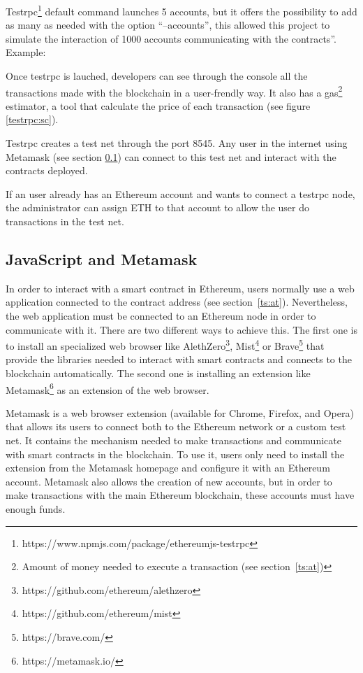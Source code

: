 \begin{itemize}
  Testrpc\footnote{https://www.npmjs.com/package/ethereumjs-testrpc} default
  command launches 5 accounts, but it offers the possibility to add as many as
  needed with the option ``--accounts'', this allowed this project to simulate
  the interaction of 1000 accounts communicating with the contracts''. Example:

   Once testrpc is lauched, developers can see through
  the console all the transactions made with the blockchain in a user-frendly
  way. It also has a gas\footnote{Amount of money needed to execute a
    transaction (see section~\ref{ts:at})} estimator, a tool that calculate the
  price of each transaction (see figure \ref{testrpc:sc}).

   Testrpc creates a test net through the port 8545. Any
  user in the internet using Metamask (see section \ref{jsmm}) can connect to
  this test net and interact with the contracts deployed.

   If an user already has an Ethereum
  account and wants to connect a testrpc node, the administrator can assign ETH
  to that account to allow the user do transactions in the test net.
\end{itemize}

\subsection{JavaScript and Metamask}
\label{jsmm}

In order to interact with a smart contract in Ethereum, users normally use a web
application connected to the contract address (see section~\ref{ts:at}).
Nevertheless, the web application must be connected to an Ethereum node in order
to communicate with it. There are two different ways to achieve this. The first
one is to install an specialized web browser like
AlethZero\footnote{https://github.com/ethereum/alethzero},
Mist\footnote{https://github.com/ethereum/mist} or
Brave\footnote{https://brave.com/} that provide the libraries needed to interact
with smart contracts and connects to the blockchain automatically. The second
one is installing an extension like Metamask\footnote{https://metamask.io/} as
an extension of the web browser.


Metamask is a web browser extension (available for Chrome, Firefox, and Opera)
that allows its users to connect both to the Ethereum network or a custom test
net. It contains the mechanism needed to make transactions and communicate with
smart contracts in the blockchain. To use it, users only need to install the
extension from the Metamask homepage and configure it with an Ethereum account.
Metamask also allows the creation of new accounts, but in order to make
transactions with the main Ethereum blockchain, these accounts must have enough
funds.

